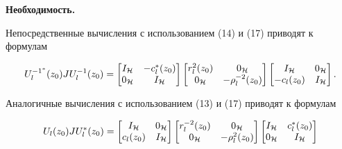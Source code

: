 \begin{pf} {\bf Необходимость.}


Непосредственные вычисления с использованием (14) и (17) приводят к формулам


$$


U_l^{-1^*}(z_0)JU_l^{-1}(z_0) =


\begin{bmatrix}I_{\cal H} & -c_l^*(z_0) \\ 0_{\cal H} & I_{\cal H}


\end{bmatrix}


\begin{bmatrix}


r_l^{2} (z_0) & 0_{\cal H} \\ 0_{\cal H} & -\rho _l^{-2} (z_0)


\end{bmatrix}


\begin{bmatrix}


I_{\cal H} & 0_{\cal H} \\ -c_l(z_0) & I_{\cal H}


\end{bmatrix}


.


$$


Аналогичные вычисления с использованием (13) и (17) приводят к формулам


\begin{equation}


U_l(z_0)JU_l^{*}(z_0)=


\begin{bmatrix}


I_{\cal H} & 0_{\cal H} \\ c_l(z_0) & I_{\cal H}


\end{bmatrix}


\begin{bmatrix}


r_l^{-2} (z_0) & 0_{\cal H} \\ 0_{\cal H} & -\rho _l^{2} (z_0)


\end{bmatrix}


\begin{bmatrix}


I_{\cal H} & c_l^*(z_0) \\ 0_{\cal H} & I_{\cal H}


\end{bmatrix}



\end{equation}
\end{pf}
